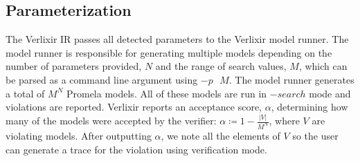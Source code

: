 \subsection{Parameterization}
The Verlixir IR passes all detected parameters to the Verlixir model runner. The model runner is responsible for generating multiple models depending on the number of parameters provided, $N$ and the range of search values, $M$, which can be parsed as a command line argument using $-p\text{ }M$. The model runner generates a total of $M^N$ Promela models. All of these models are run in $-search$ mode and violations are reported. Verlixir reports an acceptance score, $\alpha$, determining how many of the models were accepted by the verifier: $\alpha \coloneq 1 - \frac{|V|}{M^N}$, where $V$ are violating models. After outputting $\alpha$, we note all the elements of $V$ so the user can generate a trace for the violation using verification mode.

